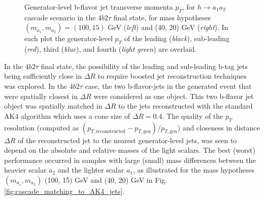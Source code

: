 \begin{figure}[h]
\begin{subfigure}{0.45\textwidth}
    \end{subfigure}  
    \caption{Generator-level b-flavor jet transverse momenta $p_{T}$, for $h \rightarrow a_1 a_2$ cascade scenario in the $4b2\tau$ final state, for mass hypotheses $(m_{a_1}, m_{a_2}) = (100, 15)$ GeV (\textit{left}) and (40, 20) GeV (\textit{right}). In each plot the generator-level $p_{T}$ of the leading (\textit{black}), sub-leading (\textit{red}), third (\textit{blue}), and fourth (\textit{light green}) are overlaid.}
    \label{fig:overlay_cascade_b_jet_gen_pT}
\end{figure}


In the $4b2\tau$ final state, the possibility of the leading and sub-leading b-tag jets being sufficiently close in $\Delta R$ to require boosted jet reconstruction techniques was explored. In the $4b2\tau$ case, the two b-flavor-jets in the generated event that were spatially closest in $\Delta R$ were considered as one object. This two b-flavor jet object was spatially matched in $\Delta R$ to the jets reconstructed with the standard AK4 algorithm which uses a cone size of $\Delta R = 0.4$. The quality of the $p_{T}$ resolution (computed as $(p_{T, \text{reconstructed}} - p_{T, \text{gen}})/ p_{T, \text{gen}}$) and closeness in distance $\Delta R$ of the reconstructed jet to the nearest generator-level jets, was seen to depend on the absolute and relative masses of the light scalars. The best (worst) performance occurred in samples with large (small) mass differences between the heavier scalar $a_2$ and the lighter scalar $a_1$, as illustrated for the mass hypotheses $(m_{a_1}, m_{a_2})$ (100, 15) GeV and (40, 20) GeV in Fig. \ref{fig:cascade_matching_to_AK4_jets}.



